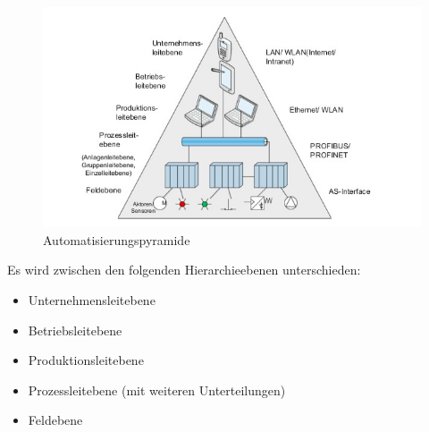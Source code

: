 \begin{figure}[h]
\centering
\includegraphics[width=125mm]{Zeichnungen/Automatisierungspyramide.jpg}
\caption{Automatisierungspyramide \citep{Linke2017} }
\label{fig:Automatisierungspyramide}
\end{figure}


Es wird zwischen den folgenden Hierarchieebenen unterschieden:
\begin{itemize}
\item Unternehmensleitebene
\item Betriebsleitebene
\item Produktionsleitebene
\item Prozessleitebene (mit weiteren Unterteilungen)
\item Feldebene
\end{itemize}

